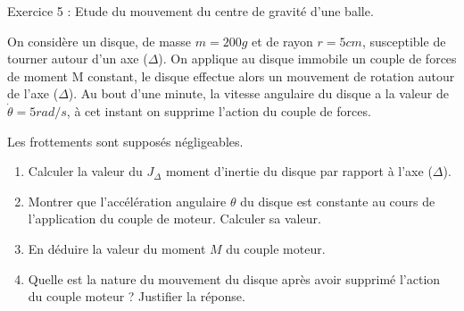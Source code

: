 \documentclass[12pt, french]{article}
\begin{document}
\begin{Box2}{Exercice 5 : Etude du mouvement du centre de gravité d’une balle. }

  On considère un disque, de masse $m = 200 g$ et de rayon $r = 5 cm$, susceptible de
tourner autour d’un axe ($\Delta$). On applique au disque immobile un couple de forces de
moment M constant, le disque effectue alors un mouvement de rotation autour de
l’axe ($\Delta$). Au bout d’une minute, la vitesse angulaire du disque a la valeur de $\dot{\theta} = 5 rad/s$, à cet instant on supprime l’action du couple de forces.

Les frottements sont supposés négligeables.

\begin{enumerate}
  \item Calculer la valeur du $J_{\Delta}$ moment d’inertie du disque par rapport à l’axe ($\Delta$).
  \item Montrer que l’accélération angulaire $\theta$ du disque est constante au cours de
l’application du couple de moteur. Calculer sa valeur.
\item En déduire la valeur du moment $M$ du couple moteur.
\item Quelle est la nature du mouvement du disque après avoir supprimé l’action du couple
moteur ? Justifier la réponse.

\end{enumerate}
\end{Box2}






\end{document}
